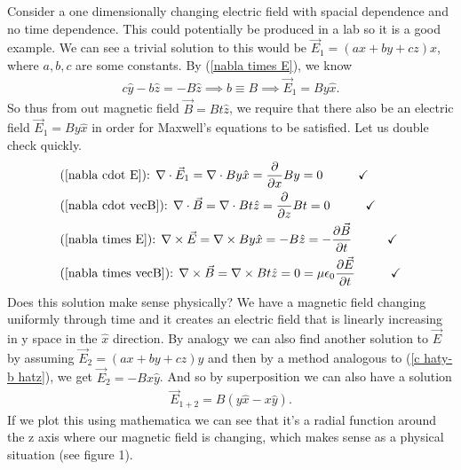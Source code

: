 \documentclass[11pt]{article}
\begin{document}
Consider a one dimensionally changing electric field with spacial dependence and no time dependence. This could potentially be produced in a lab so it is a good example. We can see a trivial solution to this would be $\vec{E}_1 = (ax+by+cz) \hat{x}$, where $a,b,c$ are some constants. By (\ref{nabla times E}), we know 
\begin{align}
c \hat{y}-b \hat{z} = -B \hat{z} \implies b \equiv B \implies \vec{E}_1 = B y\hat{x}. \label{c haty-b hatz}
\end{align}
So thus from out magnetic field $\vec{B} = Bt\hat{z}$, we require that there also be an electric field $\vec{E}_1=By \hat{x}$ in order for Maxwell's equations to be satisfied. Let us double check quickly. 
\begin{align}
&\textrm{(\ref{nabla cdot E}): }\nabla \cdot \vec{E}_1 = \nabla \cdot By \hat{x} = \frac{\partial}{\partial x} By = 0 \hspace{1cm} \checkmark \\
&\textrm{(\ref{nabla cdot vecB}): } \nabla \cdot \vec{B} = \nabla \cdot Bt \hat{z} = \frac{\partial}{\partial z} Bt = 0 \hspace{1cm} \checkmark \\
&\textrm{(\ref{nabla times E}): } \nabla \times \vec{E} = \nabla \times B y \hat{x} = -B \hat{z} = -\frac{\partial \vec{B}}{\partial t}   \hspace{1cm} \checkmark \\
&\textrm{(\ref{nabla times vecB}): } \nabla \times \vec{B} = \nabla \times Bt\hat{z} = 0 = \mu\epsilon_0\frac{\partial \vec{E}}{\partial t}\hspace{1cm} \checkmark 
\end{align}
Does this solution make sense physically? We have a magnetic field changing uniformly through time and it creates an electric field that is linearly increasing in y space in the $\hat{x}$ direction. By analogy we can also find another solution to $\vec{E}$ by assuming $\vec{E}_2 = (ax+by+cz)\hat{y}$ and then by a method analogous to (\ref{c haty-b hatz}), we get $\vec{E}_2 = -Bx\hat{y}$. And so by superposition we can also have a solution
\begin{align}
\vec{E}_{1+2} = B(y \hat{x}-x\hat{y}).
\end{align}
If we plot this using mathematica we can see that it's a radial function around the z axis where our magnetic field is changing, which makes sense as a physical situation (see figure 1).
\end{document}
